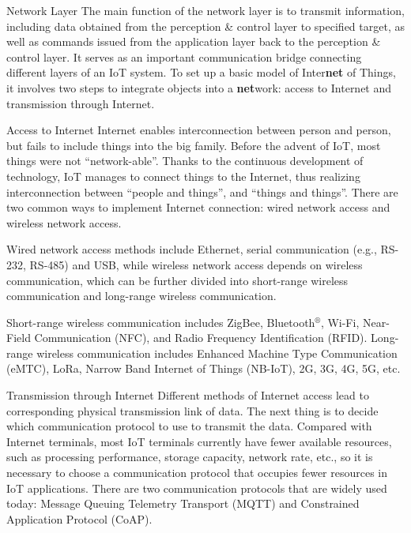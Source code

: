 \documentclass[a4paper,12pt]{book}
\begin{document}
\begin{term}{Network Layer}
    The main function of the network layer is to transmit information, including data obtained from the perception \& control layer to specified target, as well as commands issued from the application layer back to the perception \& control layer. It serves as an important communication bridge connecting different layers of an IoT system. To set up a basic model of Inter\textbf{net} of Things, it involves two steps to integrate objects into a \textbf{net}work: access to Internet and transmission through Internet.
    
    \parskip 6pt
    \begin{secterm}{Access to Internet}
        Internet enables interconnection between person and person, but fails to include things into the big family. Before the advent of IoT, most things were not “network-able”. Thanks to the continuous development of technology, IoT manages to connect things to the Internet, thus realizing interconnection between “people and things”, and “things and things”. There are two common ways to implement Internet connection: wired network access and wireless network access.

        \parskip 6pt
        Wired network access methods include Ethernet, serial communication (e.g., RS-232, RS-485) and USB, while wireless network access depends on wireless communication, which can be further divided into short-range wireless communication and long-range wireless communication.
        
        Short-range wireless communication includes ZigBee, Bluetooth$^\circledR$, Wi-Fi, Near-Field Communication (NFC), and Radio Frequency Identification (RFID). Long-range wireless communication includes Enhanced Machine Type Communication (eMTC), LoRa, Narrow Band Internet of Things (NB-IoT), 2G, 3G, 4G, 5G, etc.
    \end{secterm}

    \begin{secterm}{Transmission through Internet}
    Different methods of Internet access lead to corresponding physical transmission link of data. The next thing is to decide which communication protocol to use to transmit the data. Compared with Internet terminals, most IoT terminals currently have fewer available resources, such as processing performance, storage capacity, network rate, etc., so it is necessary to choose a communication protocol that occupies fewer resources in IoT applications. There are two communication protocols that are widely used today: Message Queuing Telemetry Transport (MQTT) and Constrained Application Protocol (CoAP).
    \end{secterm}
\end{term}
\end{document}
